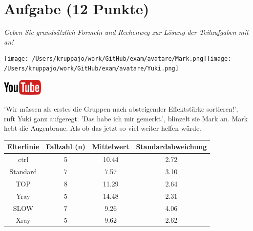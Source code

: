\documentclass[a4paper, 9pt]{scrartcl}\usepackage[]{graphicx}\usepackage[]{xcolor}
\newenvironment{knitrout}{}{} %
\begin{document}
\section{Aufgabe \hfill (12 Punkte)}

\textit{Geben Sie grundsätzlich Formeln und Rechenweg zur Lösung der Teilaufgaben mit an!} \\[1Ex]
 

 
\begin{minipage}[t]{0.5\textwidth}
\texttt{[image: /Users/kruppajo/work/GitHub/exam/avatare/Mark.png]}\hspace{-4mm}\texttt{[image: /Users/kruppajo/work/GitHub/exam/avatare/Yuki.png]}
\end{minipage}
\begin{minipage}[t]{0.5\textwidth}
\hfill
\href{https://youtu.be/RagTFFKFbFg}{\includegraphics[width = 2cm]{img/youtube}}
\end{minipage}
\vspace{1ex}



'Wir müssen als erstes die Gruppen nach absteigender Effektstärke sortieren!', ruft Yuki ganz aufgeregt. 'Das habe ich mir gemerkt.', blinzelt sie Mark an. Mark hebt die Augenbraue. Als ob das jetzt so viel weiter helfen würde.

\begin{knitrout}
\color{fgcolor}\begin{table}[!h]
\centering\begingroup\fontsize{12}{14}\selectfont

\begin{tabular}{cccc}
\toprule
\textbf{Elterlinie} & \textbf{Fallzahl (n)} & \textbf{Mittelwert} & \textbf{Standardabweichung}\\
\midrule
ctrl & 5 & 10.44 & 2.72\\
Standard & 7 & 7.57 & 3.10\\
TOP & 8 & 11.29 & 2.64\\
Yray & 5 & 14.48 & 2.31\\
SLOW & 7 & 9.26 & 4.06\\
\addlinespace
Xray & 5 & 9.62 & 2.62\\
\bottomrule
\end{tabular}
\endgroup{}
\end{table}

\end{knitrout}
\end{document}
